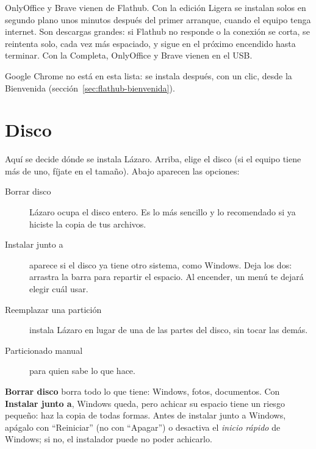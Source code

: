 \begin{nota}
OnlyOffice y Brave vienen de Flathub. Con la edición Ligera se
instalan solos en segundo plano unos minutos después del primer arranque,
cuando el equipo tenga internet. Son descargas grandes: si Flathub no
responde o la conexión se corta, se reintenta solo, cada vez más
espaciado, y sigue en el próximo encendido hasta terminar. Con la Completa, OnlyOffice y Brave vienen
en el USB.

Google Chrome no está en esta lista: se instala después, con un clic,
desde la Bienvenida (sección~\ref{sec:flathub-bienvenida}).
\end{nota}

\section{Disco}\label{sec:particiones}

Aquí se decide dónde se instala Lázaro. Arriba, elige el disco (si el
equipo tiene más de uno, fíjate en el tamaño). Abajo aparecen las opciones:

\begin{description}
  \item[Borrar disco] Lázaro ocupa el disco entero. Es lo más sencillo y
    lo recomendado si ya hiciste la copia de tus archivos.
  \item[Instalar junto a] aparece si el disco ya tiene otro sistema, como
    Windows. Deja los dos: arrastra la barra para repartir el espacio. Al
    encender, un menú te dejará elegir cuál usar.
  \item[Reemplazar una partición] instala Lázaro en lugar de una de las
    partes del disco, sin tocar las demás.
  \item[Particionado manual] para quien sabe lo que hace.
\end{description}


\begin{cuidado}
\textbf{Borrar disco} borra todo lo que tiene: Windows, fotos, documentos.
Con \textbf{Instalar junto a}, Windows queda, pero achicar su espacio tiene
un riesgo pequeño: haz la copia de todas formas. Antes de instalar junto
a Windows, apágalo con \enquote{Reiniciar} (no con \enquote{Apagar}) o
desactiva el \emph{inicio rápido} de Windows; si no, el instalador puede no
poder achicarlo.
\end{cuidado}

